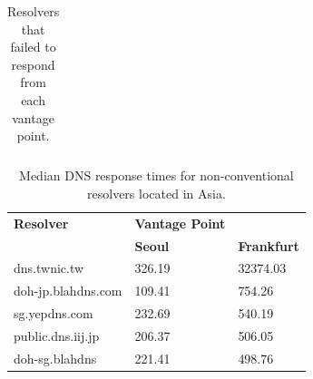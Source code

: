 \begin{table}
\begin{tabular}{lllll}
\end{tabular}
\caption{Resolvers that failed to respond from each vantage point.}
\label{tab:UnresponsiveResolvers}
\end{table}

\begin{table}
\centering
\begin{tabular}{lll}
\toprule
\textbf{Resolver} & \textbf{Vantage Point} & \\
                  & \textbf{Seoul}         & \textbf{Frankfurt} \\
\midrule
dns.twnic.tw                                & 326.19                                           & 32374.03                            \\
doh-jp.blahdns.com                          & 109.41                                           & 754.26                              \\
sg.yepdns.com                               & 232.69                                           & 540.19                              \\
public.dns.iij.jp                           & 206.37                                           & 506.05                              \\
doh-sg.blahdns                              & 221.41                                           & 498.76                              \\
\bottomrule
\end{tabular}
\caption{Median DNS response times for non-conventional resolvers located in Asia.}
\label{tab:UnconvAsia}
\end{table}

